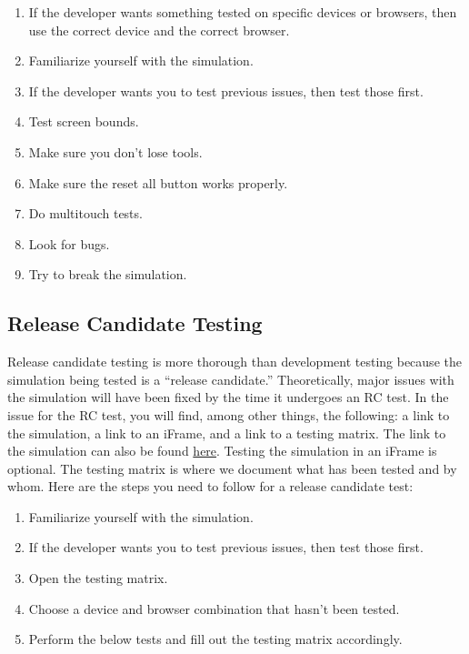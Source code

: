 \documentclass[titlepage]{article}
\begin{document}
		\begin{enumerate}
			\item If the developer wants something tested on specific devices or browsers, then use the correct device and the correct browser.
			\item Familiarize yourself with the simulation.
			\item If the developer wants you to test previous issues, then test those first.
			\item Test screen bounds.
			\item Make sure you don't lose tools.
			\item Make sure the reset all button works properly.
			\item Do multitouch tests.
			\item Look for bugs.
			\item Try to break the simulation.
		\end{enumerate}

	\subsection{Release Candidate Testing}
	
Release candidate testing is more thorough than development testing because the simulation being tested is a ``release candidate.'' Theoretically, major issues with the simulation will have been fixed by the time it undergoes an RC test. In the issue for the RC test, you will find, among other things, the following: a link to the simulation, a link to an iFrame, and a link to a testing matrix. The link to the simulation can also be found \href{https://phet-dev.colorado.edu/html/}{here}. Testing the simulation in an iFrame is optional. The testing matrix is where we document what has been tested and by whom. Here are the steps you need to follow for a release candidate test:
	
		\begin{enumerate}
			\item Familiarize yourself with the simulation.
			\item If the developer wants you to test previous issues, then test those first.
			\item Open the testing matrix.
			\item Choose a device and browser combination that hasn't been tested.
			\item Perform the below tests and fill out the testing matrix accordingly.
		\end{enumerate}
\end{document}

